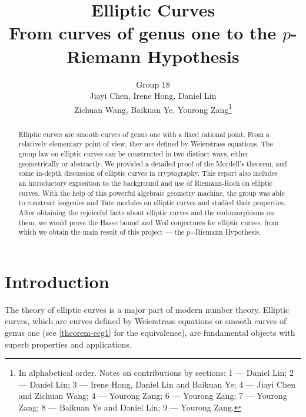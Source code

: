 \documentclass[12pt]{article}
\title{Elliptic Curves\\
    \Large From curves of genus one to the $p$-Riemann Hypothesis}
\author{Group 18\\ Jiayi Chen, Irene Hong, Daniel Lin\\ Zichuan Wang, Baikuan Ye, Yourong Zang\footnote{In alphabetical order. Notes on contributions by sections: 1 --- Daniel Lin; 2 --- Daniel Lin; 3 --- Irene Hong, Daniel Lin and Baikuan Ye; 4 --- Jiayi Chen and Zichuan Wang; 4 --- Yourong Zang; 6 --- Yourong Zang; 7 --- Yourong Zang; 8 --- Baikuan Ye and Daniel Lin; 9 --- Yourong Zang.}}
\theoremstyle{remark}
\theoremstyle{definition}
\begin{document}
    \maketitle
    \begin{abstract}
        Elliptic curves are smooth curves of genus one with a fixed rational point. From a relatively elementary point of view, they are defined by Weierstrass equations. The group law on elliptic curves can be constructed in two distinct ways, either geometrically or abstractly. We provided a detailed proof of the Mordell's theorem, and some in-depth discussion of elliptic curves in cryptography. This report also includes an introductory exposition to the background and use of Riemann-Roch on elliptic curves. With the help of this powerful algebraic geometry machine, the group was able to construct isogenies and Tate modules on elliptic curves and studied their properties. After obtaining the rejoiceful facts about elliptic curves and the endomorphisms on them, we would prove the Hasse bound and Weil conjectures for elliptic curves, from which we obtain the main result of this project --- the $p$=Riemann Hypothesis.
    \end{abstract}
    \thispagestyle{empty}
    \newpage
    \tableofcontents
    \thispagestyle{empty}
    \newpage
    \setcounter{page}{1}
    \section{Introduction}\label{sec-intro}
        The theory of elliptic curves is a major part of modern number theory. Elliptic curves, which are curves defined by Weierstrass equations or smooth curves of genus one (see \autoref{theorem-ecg1} for the equivalence), are fundamental objects with superb properties and applications.
        
\end{document}
